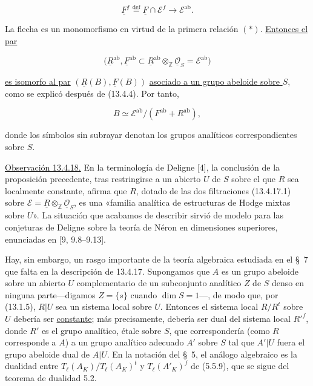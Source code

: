 \begin{equation*}
 \underline F^f\stackrel{\mathrm{def}}{=}
 \underline F\cap\mathcal E^f\longrightarrow\mathcal E^{\mathrm{ab}}.
\end{equation*}

\noindent
La flecha es un monomorfismo en virtud de la primera relación $(*)$.
\underline{Entonces el par}

\begin{equation*}
 \bigl(\underline R^{\mathrm{ab}},
 \underline F^{\mathrm{ab}}\subset
 \underline R^{\mathrm{ab}}\otimes_{\mathbb Z}
 \underline{\mathcal O}_S=\mathcal E^{\mathrm{ab}}\bigr)
\end{equation*}

\noindent
\underline{es isomorfo al par}
$(\underline R(B),\underline F(B))$
\underline{asociado a un grupo abeloide sobre $S$}, como se explicó
después de (13.4.4). Por tanto,

\begin{equation*}
 B\simeq\mathcal E^{\mathrm{ab}}/
 (F^{\mathrm{ab}}+R^{\mathrm{ab}}),
\end{equation*}

\noindent
donde los símbolos sin subrayar denotan los grupos analíticos
correspondientes sobre $S$.

\medskip
\noindent
\underline{Observación 13.4.18.} En la terminología de Deligne [4], la
conclusión de la proposición precedente, tras restringirse a un abierto
$U$ de $S$ sobre el que $R$ sea localmente constante, afirma que $R$,
dotado de las dos filtraciones (13.4.17.1) sobre
$\mathcal E=\underline R\otimes_{\mathbb Z}\underline{\mathcal O}_S$,
es una «familia analítica de estructuras de Hodge mixtas sobre $U$».
La situación que acabamos de describir sirvió de modelo para las
conjeturas de Deligne sobre la teoría de Néron en dimensiones
superiores, enunciadas en [9, 9.8--9.13].

Hay, sin embargo, un rasgo importante de la teoría algebraica estudiada
en el \S~7 que falta en la descripción de 13.4.17. Supongamos que $A$ es
un grupo abeloide sobre un abierto $U$ complementario de un subconjunto
analítico $Z$ de $S$ denso en ninguna parte---digamos $Z=\{s\}$ cuando
$\dim S=1$---, de modo que, por (13.1.5), $R|U$ sea un sistema local
sobre $U$. Entonces el sistema local $R/R^t$ sobre $U$ debería ser
\underline{constante}; más precisamente, debería ser dual del sistema
local ${R'}^f$, donde $R'$ es el grupo analítico, étale sobre $S$, que
correspondería (como $R$ corresponde a $A$) a un grupo analítico
adecuado $A'$ sobre $S$ tal que $A'|U$ fuera el grupo abeloide dual de
$A|U$. En la notación del \S~5, el análogo algebraico es la dualidad
entre $T_\ell(A_K)/T_\ell(A_K)^t$ y $T_\ell(A'_K)^f$ de (5.5.9), que
se sigue del teorema de dualidad 5.2.

